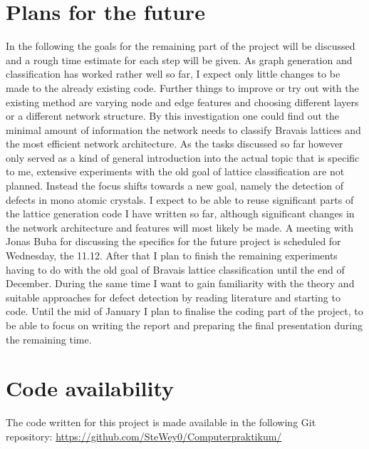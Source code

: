 \documentclass[11pt,a4paper]{article}
\begin{document}
\section{Plans for the future}
\label{sec:Plans for the future}
In the following the goals for the remaining part of the project will be discussed and a rough time estimate for each step will be given. 
As graph generation and classification has worked rather well so far, I expect only little changes to be made to the already existing code. 
Further things to improve or try out with the existing method are varying node and edge features and choosing different layers or a different network structure. 
By this investigation one could find out the minimal amount of information the network needs to classify Bravais lattices and the most efficient network architecture. 
As the tasks discussed so far however only served as a kind of general introduction into the actual topic that is specific to me, extensive experiments with the old goal of lattice classification are not planned. 
Instead the focus shifts towards a new goal, namely the detection of defects in mono atomic crystals. 
I expect to be able to reuse significant parts of the lattice generation code I have written so far, although significant changes in the network architecture and features will most likely be made. 
A meeting with Jonas Buba for discussing the specifics for the future project is scheduled for Wednesday, the 11.12. 
After that I plan to finish the remaining experiments having to do with the old goal of Bravais lattice classification until the end of December. 
During the same time I want to gain familiarity with the theory and suitable approaches for defect detection by reading literature and starting to code. 
Until the mid of January I plan to finalise the coding part of the project, to be able to focus on writing the report and preparing the final presentation during the remaining time. 

\section{Code availability}
\label{sec:Code availability}
The code written for this project is made available in the following Git repository: \url{https://github.com/SteWey0/Computerpraktikum/}


\renewcommand\refname{Bibliography}
\printbibliography[
heading=bibintoc,
title={Bibliography}
]
\end{document}
